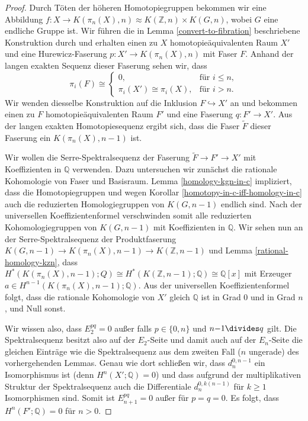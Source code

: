 \documentclass[11pt, a4paper, german]{article}
\theoremstyle{definition}
\theoremstyle{remark}
\newcommand{\Z}{\mathbb{Z}} %
\newcommand{\Q}{\mathbb{Q}} %
\begin{document}
\begin{proof}
  Durch Töten der höheren Homotopiegruppen bekommen wir eine Abbildung $f : X \to K(\pi_n(X), n) \approx K(\Z, n) \times K(G, n)$, wobei $G$ eine endliche Gruppe ist.
  Wir führen die in Lemma \ref{convert-to-fibration} beschriebene Konstruktion durch und erhalten einen zu $X$ homotopieäquivalenten Raum $X'$ und eine Hurewicz-Faserung $p : X' \to K(\pi_n(X), n)$ mit Faser $F$.
  Anhand der langen exakten Sequenz dieser Faserung sehen wir, dass
  \[
    \pi_i(F) \cong \begin{cases}
      0, & \text{für $i \leq n$}, \\
      \pi_i(X') \cong \pi_i(X), & \text{für $i > n$.}
    \end{cases}
  \]
  Wir wenden diesselbe Konstruktion auf die Inklusion $F \hookrightarrow X'$ an und bekommen einen zu $F$ homotopieäquivalenten Raum $F'$ und eine Faserung $q : F' \to X'$.
  Aus der langen exakten Homotopiesequenz ergibt sich, dass die Faser $\tilde{F}$ dieser Faserung ein $K(\pi_n(X), n{-}1)$ ist.

  Wir wollen die Serre-Spektralsequenz der Faserung $\tilde{F} \to F' \to X'$ mit Koeffizienten in $\Q$ verwenden.
  Dazu untersuchen wir zunächst die rationale Kohomologie von Faser und Basisraum.
  Lemma \ref{homology-kgn-in-c} impliziert, dass die Homotopiegruppen und wegen Korollar \ref{homotopy-in-c-iff-homology-in-c} auch die reduzierten Homologiegruppen von $K(G, n{-}1)$ endlich sind.
  Nach der universellen Koeffizientenformel verschwinden somit alle reduzierten Kohomologiegruppen von $K(G, n{-}1)$ mit Koeffizienten in $\Q$.
  Wir sehen nun an der Serre-Spektralsequenz der Produktfaserung $K(G, n{-}1) \to K(\pi_n(X), n{-}1) \to K(\Z, n{-}1)$ und Lemma \ref{rational-homology-kzn}, dass $H^*(K(\pi_n(X), n{-}1); Q) \cong H^*(K(\Z, n{-}1); \Q) \cong \Q[x]$ mit Erzeuger $a \in H^{n-1}(K(\pi_n(X), n{-}1); \Q)$.
  Aus der universellen Koeffizientenformel folgt, dass die rationale Kohomologie von $X'$ gleich $\Q$ ist in Grad 0 und in Grad $n$, und Null sonst.

  Wir wissen also, dass $E_2^{pq} = 0$ außer falls $p \in \{ 0, n \}$ und $n{-}1 \divides q$ gilt.
  Die Spektralsequenz besitzt also auf der $E_2$-Seite und damit auch auf der $E_n$-Seite die gleichen Einträge wie die Spektralsequenz aus dem zweiten Fall ($n$ ungerade) des vorhergehenden Lemmas.
  Genau wie dort schließen wir, dass $d_n^{0,n-1}$ ein Isomorphismus ist (denn $H^n(X'; \Q) = 0$) und dass aufgrund der multiplikativen Struktur der Spektralsequenz auch die Differentiale $d_n^{0,k(n-1)}$ für $k \geq 1$ Isomorphismen sind.
  Somit ist $E_{n+1}^{pq} = 0$ außer für $p = q = 0$.
  Es folgt, dass $H^n(F'; \Q) = 0$ für $n > 0$.
\end{proof}
\end{document}
